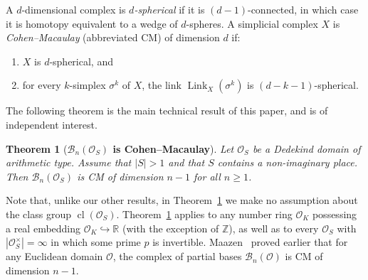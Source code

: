\documentclass[11 pt]{article}
\theoremstyle{plain}
\newtheorem{maintheorem}{Theorem}
\theoremstyle{definition}
\numberwithin{equation}{section}
\newcommand\R{\ensuremath{\mathbb{R}}}
\newcommand\Z{\ensuremath{\mathbb{Z}}}
\newcommand{\para}[1]{\bigskip\noindent\textbf{#1.}}
\renewcommand{\O}{\mathcal{O}}
\newcommand\PartialBases{\ensuremath{\mathcal{B}}}
\newcommand{\PB}{\PartialBases}
\DeclareMathOperator{\class}{cl}
\DeclareMathOperator{\Link}{Link}
\newcommand\into{\hookrightarrow}
\newcommand\abs[1]{\left\lvert#1\right\rvert}
\begin{document}
A $d$-dimensional complex is \emph{$d$-spherical} if it is $(d-1)$-connected, in which case it is homotopy equivalent to a wedge of $d$-spheres.   %
 A simplicial complex $X$ is \emph{Cohen--Macaulay} (abbreviated CM) of dimension $d$ if:
\begin{enumerate}[itemsep=2.5pt,parsep=2.5pt,topsep=4pt]
\item $X$ is $d$-spherical, and 
\item for every $k$-simplex $\sigma^k$ of $X$, the link $\Link_X(\sigma^k)$
is $(d-k-1)$-spherical.
\end{enumerate}
\noindent The following theorem is the main technical result of this paper, and is of independent interest.  
\begin{maintheorem}[\textbf{\boldmath$\PartialBases_n(\O_S)$ is Cohen--Macaulay}]
\label{maintheorem:partialbasescm}
Let $\O_S$ be a Dedekind domain of arithmetic type. Assume that $\abs{S}>1$ and that $S$ contains a non-imaginary place.
Then $\PartialBases_n(\O_S)$ is CM of dimension $n-1$ for all $n \geq 1$.
\end{maintheorem}
Note that, unlike our other results, in Theorem~\ref{maintheorem:partialbasescm} we make no assumption about the class group $\class(\O_S)$.
Theorem~\ref{maintheorem:partialbasescm} applies to any number ring $\O_K$ possessing a real embedding $\O_K\into \R$ (with the exception of $\Z$), as well as to 
every $\O_S$ with $\abs{\O_S^\times}=\infty$ in which some prime $p$ is invertible.
Maazen~\cite{MaazenThesis} proved earlier that for any Euclidean domain $\O$, the complex of partial bases $\PB_n(\O)$ is CM of dimension $n-1$. 
\end{document}
